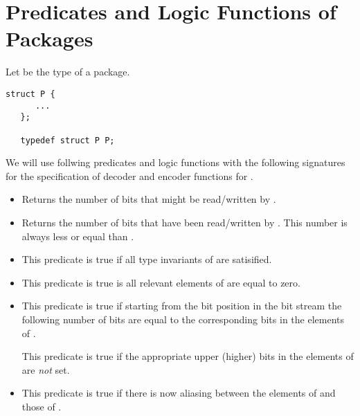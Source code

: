 \documentclass[paper=a4,12pt,DIV16,BCOR8mm,fleqn,twoside]{scrartcl}
\begin{document}
\section{Predicates and Logic Functions of Packages}


Let  be the type of a package.

\begin{lstlisting}[style = acsl-block]
   struct P {
      ...
   };

   typedef struct P P;
\end{lstlisting}

We will use follwing \acsl predicates and logic functions with the following signatures
for the specification of decoder and encoder functions for .

\begin{itemize}
\item
{}

Returns the number of bits that might be read/written by .

\item
{}

Returns the number of bits that have been read/written by .
This number is always less or equal than .

\item
{}

This predicate is true if all type invariants of 
are satisified.

\item
{}

This predicate is true is all relevant elements of  are
equal to zero.

\item
{}

This predicate is true if starting from the bit position
 in the bit stream  the following
 number of bits are equal to the corresponding bits
in the elements of .


This predicate is true if the appropriate upper (higher) bits
in the elements of  are \emph{not} set.

\item
{}

This predicate is true if there is now aliasing between the elements of
 and those of .

\end{itemize}



%
%
\end{document}
